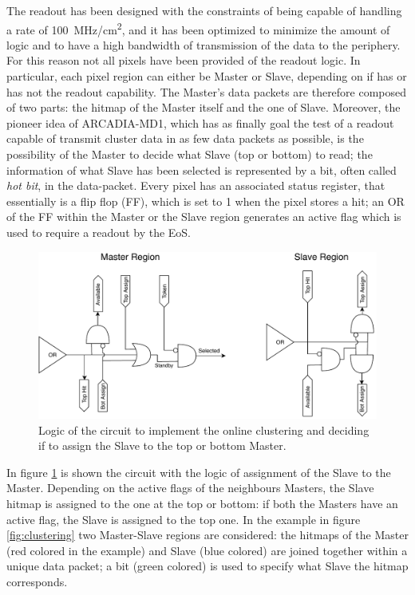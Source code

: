         The readout has been designed with the constraints of being capable of handling a rate of \SI{100}{MHz/cm\squared}, and it has been optimized to minimize the amount of logic and to have a high bandwidth of transmission of the data to the periphery. For this reason not all pixels have been provided of the readout logic.
        In particular, each pixel region can either be Master or Slave, depending on if has or has not the readout capability. 
        The Master's data packets are therefore composed of two parts: the hitmap of the Master itself and the one of Slave. 
        Moreover, the pioneer idea of ARCADIA-MD1, which has as finally goal the test of a readout capable of transmit cluster data in as few data packets as possible, is the possibility of the Master to decide what Slave (top or bottom) to read; the information of what Slave has been selected is represented by a bit, often called \emph{hot bit}, in the data-packet.
        Every pixel has an associated status register, that essentially is a flip flop (FF), which is set to 1 when the pixel stores a hit; an OR of the FF within the Master or the Slave region generates an active flag which is used to require a readout by the EoS.  
        \begin{figure}[h!]
            \centering
            \includegraphics[width=.75\linewidth]{figures/ARCADIA/clustering_logic.pdf}
            \caption{Logic of the circuit to implement the online clustering and deciding if to assign the Slave to the top or bottom Master.}
            \label{fig:clustering_logic}
        \end{figure}
        In figure \ref{fig:clustering_logic} is shown the circuit with the logic of assignment of the Slave to the Master.
        Depending on the active flags of the neighbours Masters, the Slave hitmap is assigned to the one at the top or bottom: if both the Masters have an active flag, the Slave is assigned to the top one. 
        In the example in figure \ref{fig:clustering} two Master-Slave regions are considered: the hitmaps of the Master (red colored in the example) and Slave (blue colored) are joined together within a unique data packet; a bit (green colored) is used to specify what Slave the hitmap corresponds. 
